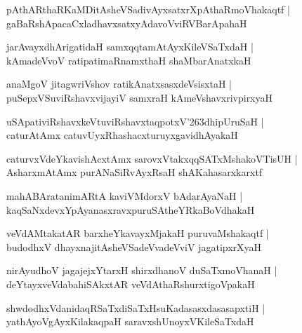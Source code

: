 \documentclass[twoside,12pt,openright]{book}
\def\S{\char'263}
\newcounter{shloka}[chapter]
\begin{document}
\begin{shloka}%
pAthARthaRKaMDitAsheVSadivAyxsatxrXpAthaRmoVhakaqtf |\\
gaBaRshApacaCxladhavxsatxyAdavoVviRVBarApahaH 
\end{shloka}

\begin{shloka}%
jarAvayxdhArigatidaH samxqqtamAtAyxKileVSaTxdaH |\\
kAmadeVvoV ratipatimaRnamxthaH shaMbarAnatxkaH 
\end{shloka}

\begin{shloka}%
anaMgoV jitagwriVshov ratikAnatxsasxdeVsisxtaH |\\
puSepxVSuviRshavxvijayiV samxraH kAmeVshavxrivpirxyaH
\end{shloka}

\begin{shloka}%
uSApativiRshavxkeVtuviRshavxtaqpotxV\S dhipUruSaH |\\
caturAtAmx catuvUyxRhashacxturuyxgavidhAyakaH 
\end{shloka}

\begin{shloka}%
caturvxVdeYkavishAcxtAmx sarovxVtakxqqSATxMshakoVTisUH |\\
AsharxmAtAmx purANaSiRvAyxRsaH shAKahasarxkarxtf
\end{shloka}

\begin{shloka}%
mahABAratanimARtA kaviVMdorxV bAdarAyaNaH |\\
kaqSaNxdevxYpAyanasxravxpuruSAtheYRkaBoVdhakaH 
\end{shloka}

\begin{shloka}%
veVdAMtakatAR barxheYkavayxMjakaH puruvaMshakaqtf |\\
budodhxV dhayxnajitAsheVSadeVvadeVviV jagatipxrXyaH 
\end{shloka}

\begin{shloka}%
nirAyudhoV jagajejxYtarxH shirxdhanoV duSaTxmoVhanaH |\\
deYtayxveVdabahiSAkxtAR veVdAthaRshurxtigoVpakaH 
\end{shloka}

\begin{shloka}%
shwdodhxVdanidaqRSaTxdiSaTxHsuKadasasxdasasapxtiH |\\
yathAyoVgAyxKilakaqpaH saravxshUnoyxVKileSaTxdaH 
\end{shloka}
\end{document}
